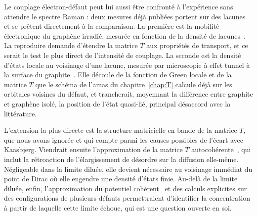 Le couplage électron-défaut peut lui aussi être confronté à l'expérience sans attendre le spectre Raman : deux mesures déjà publiées portent sur des lacunes et se prêtent directement à la comparaison. La première est la mobilité électronique du graphène irradié, mesurée en fonction de la densité de lacunes~\cite{chenDefectScatteringGraphene2009}. La reproduire demande d'étendre la matrice $T$ aux propriétés de transport, et ce serait le test le plus direct de l'intensité de couplage. La seconde est la densité d'états locale au voisinage d'une lacune, mesurée par microscopie à effet tunnel à la surface du graphite~\cite{ugedaMissingAtomSource2010}. Elle découle de la fonction de Green locale et de la matrice $T$ que le schéma de l'amas du chapitre~\ref{chap:T} calcule déjà sur les orbitales voisines du défaut, et trancherait, moyennant la différence entre graphite et graphène isolé, la position de l'état quasi-lié, principal désaccord avec la littérature.

\bigskip
{}

L'extension la plus directe est la structure matricielle en bande de la matrice $T$, que nous avons ignorée et qui compte parmi les causes possibles de l'écart avec Kaasbjerg. Viendrait ensuite l'approximation de la matrice $T$ autocohérente~\cite{klauderModificationElectronEnergy1961,peresElectronicPropertiesDisordered2006}, qui inclut la rétroaction de l'élargissement de désordre sur la diffusion elle-même. Négligeable dans la limite diluée, elle devient nécessaire au voisinage immédiat du point de Dirac où elle engendre une densité d'états finie. Au-delà de la limite diluée, enfin, l'approximation du potentiel cohérent~\cite{sovenCoherentPotentialModelSubstitutional1967} et des calculs explicites sur des configurations de plusieurs défauts permettraient d'identifier la concentration à partir de laquelle cette limite échoue, qui est une question ouverte en soi.

\bigskip
{}

